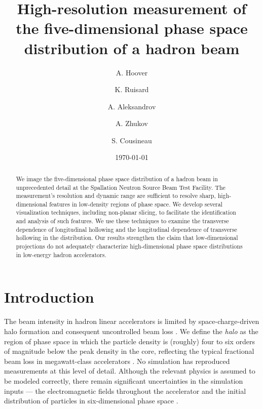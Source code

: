\documentclass[%
 reprint,
 amsmath,amssymb,
 aps,
prstab,
]{revtex4-2}
\begin{document}

\title{High-resolution measurement of the five-dimensional phase space distribution of a hadron beam}

\author{A. Hoover}%
\author{K. Ruisard}%
\author{A. Aleksandrov}%
\author{A. Zhukov}%
\author{S. Cousineau}

\date{\today}


\begin{abstract}


We image the five-dimensional phase space distribution of a hadron beam in unprecedented detail at the Spallation Neutron Source Beam Test Facility. The measurement’s resolution and dynamic range are sufficient to resolve sharp, high-dimensional features in low-density regions of phase space. We develop several visualization techniques, including non-planar slicing, to facilitate the identification and analysis of such features. We use these techniques to examine the transverse dependence of longitudinal hollowing and the longitudinal dependence of transverse hollowing in the distribution. Our results strengthen the claim that low-dimensional projections do not adequately characterize high-dimensional phase space distributions in low-energy hadron accelerators.

\end{abstract}

\maketitle




\section{Introduction}\label{sec:1}

The beam intensity in hadron linear accelerators is limited by space-charge-driven halo formation \cite{Gluckstern1994, Wangler1998} and consequent uncontrolled beam loss \cite{Cousineau2015}. We define the \textit{halo} as the region of phase space in which the particle density is (roughly) four to six orders of magnitude below the peak density in the core, reflecting the typical fractional beam loss in megawatt-class accelerators \cite{Aleksandrov2020}. No simulation has reproduced measurements at this level of detail. Although the relevant physics is assumed to be modeled correctly, there remain significant uncertainties in the simulation inputs --- the electromagnetic fields throughout the accelerator and the initial distribution of particles in six-dimensional phase space \cite{Allen2002, Qiang2002}.
\end{document}
